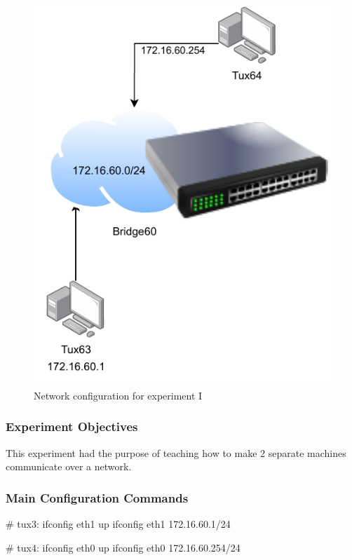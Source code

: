 \documentclass[11pt,a4paper,twocolumn]{article}
\begin{document}
\begin{figure}[H]
    \centering
    \includegraphics[scale=0.5]{experiment1}
    \caption{Network configuration for experiment I}
\end{figure}

\subsubsection{Experiment Objectives}

This experiment had the purpose of teaching how to make 2 separate machines communicate over a network.

\subsubsection{Main Configuration Commands}

\begin{code-bash}
# tux3:
ifconfig eth1 up
ifconfig eth1 172.16.60.1/24

# tux4:
ifconfig eth0 up
ifconfig eth0 172.16.60.254/24

\end{code-bash}
\end{document}
